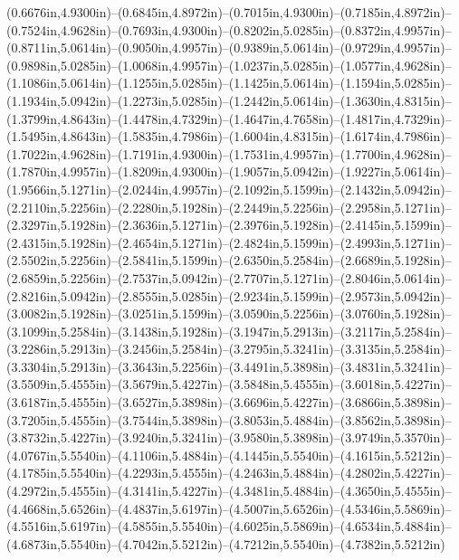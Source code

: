 (0.6676in,4.9300in)--(0.6845in,4.8972in)--(0.7015in,4.9300in)--(0.7185in,4.8972in)--(0.7524in,4.9628in)--(0.7693in,4.9300in)--(0.8202in,5.0285in)--(0.8372in,4.9957in)--(0.8711in,5.0614in)--(0.9050in,4.9957in)--(0.9389in,5.0614in)--(0.9729in,4.9957in)--(0.9898in,5.0285in)--(1.0068in,4.9957in)--(1.0237in,5.0285in)--(1.0577in,4.9628in)--(1.1086in,5.0614in)--(1.1255in,5.0285in)--(1.1425in,5.0614in)--(1.1594in,5.0285in)--(1.1934in,5.0942in)--(1.2273in,5.0285in)--(1.2442in,5.0614in)--(1.3630in,4.8315in)--(1.3799in,4.8643in)--(1.4478in,4.7329in)--(1.4647in,4.7658in)--(1.4817in,4.7329in)--(1.5495in,4.8643in)--(1.5835in,4.7986in)--(1.6004in,4.8315in)--(1.6174in,4.7986in)--(1.7022in,4.9628in)--(1.7191in,4.9300in)--(1.7531in,4.9957in)--(1.7700in,4.9628in)--(1.7870in,4.9957in)--(1.8209in,4.9300in)--(1.9057in,5.0942in)--(1.9227in,5.0614in)--(1.9566in,5.1271in)--(2.0244in,4.9957in)--(2.1092in,5.1599in)--(2.1432in,5.0942in)--(2.2110in,5.2256in)--(2.2280in,5.1928in)--(2.2449in,5.2256in)--(2.2958in,5.1271in)--(2.3297in,5.1928in)--(2.3636in,5.1271in)--(2.3976in,5.1928in)--(2.4145in,5.1599in)--(2.4315in,5.1928in)--(2.4654in,5.1271in)--(2.4824in,5.1599in)--(2.4993in,5.1271in)--(2.5502in,5.2256in)--(2.5841in,5.1599in)--(2.6350in,5.2584in)--(2.6689in,5.1928in)--(2.6859in,5.2256in)--(2.7537in,5.0942in)--(2.7707in,5.1271in)--(2.8046in,5.0614in)--(2.8216in,5.0942in)--(2.8555in,5.0285in)--(2.9234in,5.1599in)--(2.9573in,5.0942in)--(3.0082in,5.1928in)--(3.0251in,5.1599in)--(3.0590in,5.2256in)--(3.0760in,5.1928in)--(3.1099in,5.2584in)--(3.1438in,5.1928in)--(3.1947in,5.2913in)--(3.2117in,5.2584in)--(3.2286in,5.2913in)--(3.2456in,5.2584in)--(3.2795in,5.3241in)--(3.3135in,5.2584in)--(3.3304in,5.2913in)--(3.3643in,5.2256in)--(3.4491in,5.3898in)--(3.4831in,5.3241in)--(3.5509in,5.4555in)--(3.5679in,5.4227in)--(3.5848in,5.4555in)--(3.6018in,5.4227in)--(3.6187in,5.4555in)--(3.6527in,5.3898in)--(3.6696in,5.4227in)--(3.6866in,5.3898in)--(3.7205in,5.4555in)--(3.7544in,5.3898in)--(3.8053in,5.4884in)--(3.8562in,5.3898in)--(3.8732in,5.4227in)--(3.9240in,5.3241in)--(3.9580in,5.3898in)--(3.9749in,5.3570in)--(4.0767in,5.5540in)--(4.1106in,5.4884in)--(4.1445in,5.5540in)--(4.1615in,5.5212in)--(4.1785in,5.5540in)--(4.2293in,5.4555in)--(4.2463in,5.4884in)--(4.2802in,5.4227in)--(4.2972in,5.4555in)--(4.3141in,5.4227in)--(4.3481in,5.4884in)--(4.3650in,5.4555in)--(4.4668in,5.6526in)--(4.4837in,5.6197in)--(4.5007in,5.6526in)--(4.5346in,5.5869in)--(4.5516in,5.6197in)--(4.5855in,5.5540in)--(4.6025in,5.5869in)--(4.6534in,5.4884in)--(4.6873in,5.5540in)--(4.7042in,5.5212in)--(4.7212in,5.5540in)--(4.7382in,5.5212in)
